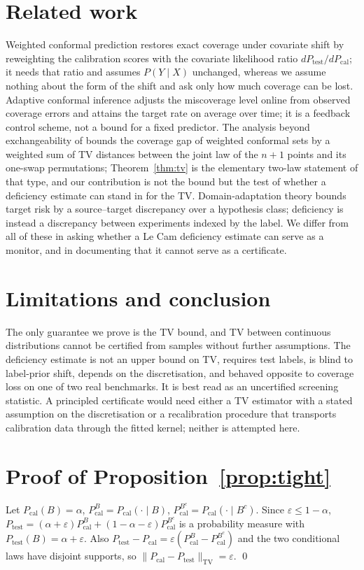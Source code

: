 \documentclass{article}
\newcommand{\TV}[2]{\|#1 - #2\|_{\mathrm{TV}}}
\newcommand{\Pcal}{P_{\mathrm{cal}}}
\newcommand{\Ptest}{P_{\mathrm{test}}}
\begin{document}
\section{Related work}
Weighted conformal prediction \citep{tibshirani2019conformal} restores exact
coverage under covariate shift by reweighting the calibration scores with the
covariate likelihood ratio $d\Ptest/d\Pcal$; it needs that ratio and assumes
$P(Y\mid X)$ unchanged, whereas we assume nothing about the form of the shift
and ask only how much coverage can be lost. Adaptive conformal inference
\citep{gibbs2021adaptive} adjusts the miscoverage level online from observed
coverage errors and attains the target rate on average over time; it is a
feedback control scheme, not a bound for a fixed predictor. The analysis
beyond exchangeability of \citet{barber2023conformal} bounds the coverage gap
of weighted conformal sets by a weighted sum of TV distances between the joint
law of the $n+1$ points and its one-swap permutations; Theorem~\ref{thm:tv}
is the elementary two-law statement of that type, and our contribution is not
the bound but the test of whether a deficiency estimate can stand in for the
TV. Domain-adaptation theory \citep{bendavid2010theory} bounds target risk by
a source--target discrepancy over a hypothesis class; deficiency is instead a
discrepancy between experiments indexed by the label. We differ from all of
these in asking whether a Le Cam deficiency estimate can serve as a monitor,
and in documenting that it cannot serve as a certificate.

\section{Limitations and conclusion}
The only guarantee we prove is the TV bound, and TV between continuous
distributions cannot be certified from samples without further assumptions.
The deficiency estimate is not an upper bound on TV, requires test labels, is
blind to label-prior shift, depends on the discretisation, and behaved
opposite to coverage loss on one of two real benchmarks. It is best read as an
uncertified screening statistic. A principled certificate would need either a
TV estimator with a stated assumption on the discretisation or a recalibration
procedure that transports calibration data through the fitted kernel; neither
is attempted here.

\appendix
\section{Proof of Proposition~\ref{prop:tight}}
\label{app:tight}
Let $\Pcal(B)=\alpha$, $\Pcal^B=\Pcal(\cdot\mid B)$, $\Pcal^{B^c}=\Pcal(\cdot\mid B^c)$.
Since $\varepsilon\le1-\alpha$, $\Ptest=(\alpha+\varepsilon)\Pcal^B+(1-\alpha-\varepsilon)\Pcal^{B^c}$
is a probability measure with $\Ptest(B)=\alpha+\varepsilon$. Also
$\Ptest-\Pcal=\varepsilon(\Pcal^B-\Pcal^{B^c})$ and the two conditional laws have
disjoint supports, so $\TV{\Pcal}{\Ptest}=\varepsilon$. \qed
\end{document}
